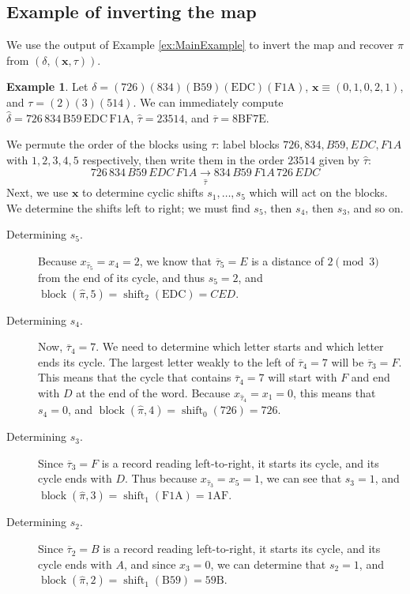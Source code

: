 \documentclass{article}
\numberwithin{theorem}{section}
\theoremstyle{definition}
\newtheorem{example}{Example}
\newcommand\pihat{\hat{\pi}}
\newcommand\taubar{\overline\tau}
\newcommand{\shift}{\operatorname{shift}}
\newcommand{\x}{\mathbf x}
\newcommand{\xtau}{(\x,\tau)}
\newcommand{\deltaxtau}{\left(\delta,\xtau\right)}
\newcommand{\block}{\operatorname{block}}
\begin{document}
\subsection{Example of inverting the map}
We use the output of Example \ref{ex:MainExample} to invert the map and recover $\pi$ from $\deltaxtau$.
\begin{example}
    Let \(\delta = \mathrm{(726)(834)(B59)(EDC)(F1A)}\), \(\x \equiv (0,1,0,2,1)\), and \(\tau = (2)(3)(514)\).
    We can immediately compute
    \(\hat\delta = \mathrm{726\,834\,B59\,EDC\,F1A}\),
    \(\hat\tau = \mathrm{23514}\), and
    \(\overline\tau = \mathrm{8BF7E}\).

    We permute the order of the blocks using $\tau$: label blocks $726,834,B59,EDC,F1A$ with $1,2,3,4,5$ respectively, then write them in the order $23514$ given by $\hat\tau$:
    \[726\,834\,B59\,EDC\,F1A \xrightarrow[\hat\tau]{} 834\,B59\,F1A\,726\,EDC\]
    Next, we use $\textbf{x}$ to determine cyclic shifts $s_1,\dots,s_5$ which will act on the blocks. We determine the shifts left to right; we must find $s_5$, then $s_4$, then $s_3$, and so on.

    \begin{description}
        \item[Determining $s_5$.]
        Because $x_{\hat\tau_5} = x_4 = 2$, we know that $\overline\tau_5 = E$ is a distance of $2 \pmod{3}$ from the end of its cycle, and thus $s_5 = 2$, and \(\block(\pihat, 5) = \shift_2(\mathrm{EDC}) = CED\).

        \item[Determining $s_4$.]
        Now, $\overline\tau_4 = 7$.
        We need to determine which letter starts and which letter ends its cycle. The largest letter weakly to the left of $\taubar_4 = 7$ will be $\overline\tau_3 = F$. This means that the cycle that contains $\taubar_4 = 7$ will start with $F$ and end with $D$ at the end of the word.
        Because $x_{\hat\tau_4} = x_1 = 0$, this means that $s_4 = 0$, and \(\block(\pihat, 4) = \shift_0(\mathrm{726})  = 726\).

        \item[Determining $s_3$.]
        Since $\overline\tau_3 = F$ is a record reading left-to-right, it starts its cycle, and its cycle ends with $D$. Thus because $x_{\hat\tau_3} = x_5 = 1$, we can see that $s_3 = 1$, and \(\block(\pihat, 3) = \shift_1(\mathrm{F1A}) = \mathrm{1AF}\).

        \item[Determining $s_2$.]
        Since $\overline\tau_2 = B$ is a record reading left-to-right, it starts its cycle, and its cycle ends with $A$, and since $x_3 = 0$, we can determine that $s_2 = 1$, and \(\block(\pihat, 2) = \shift_1(\mathrm{B59}) = \mathrm{59B}\).


\end{description}
\end{example}
\end{document}
